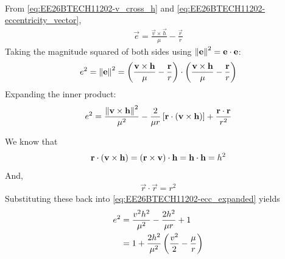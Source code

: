 \begin{enumerate}[label=\thesubsection.\arabic*, ref=\thesubsection.\theenumi]
\begin{align}
\end{align}
\solution
From \eqref{eq:EE26BTECH11202-v_cross_h} and \eqref{eq:EE26BTECH11202-eccentricity_vector},
\begin{align}
\vec{e} = \frac{\vec{v} \times \vec{h}}{\mu} - \frac{\vec{r}}{r}
\end{align}
Taking the magnitude squared of both sides using $\left\lVert\mathbf{e}\right\rVert^2 = \mathbf{e} \cdot \mathbf{e}$:
\begin{align}
e^2 = \left\lVert\mathbf{e}\right\rVert^2 = \left(\frac{\mathbf{v} \times \mathbf{h}}{\mu} - \frac{\mathbf{r}}{r}\right) \cdot \left(\frac{\mathbf{v} \times \mathbf{h}}{\mu} - \frac{\mathbf{r}}{r}\right)
\end{align}
Expanding the inner product:
\begin{align}
e^2 = \frac{\left\lVert\mathbf{v} \times \mathbf{h}\right\rVert^2}{\mu^2} - \frac{2}{\mu r} {}\left[\mathbf{r} \cdot \left(\mathbf{v} \times \mathbf{h}\right)\right] + \frac{\mathbf{r} \cdot \mathbf{r}}{r^2}
\label{eq:EE26BTECH11202-ecc_expanded}
\end{align}

We know that
\begin{align}
\mathbf{r} \cdot \left(\mathbf{v} \times \mathbf{h}\right) = \left(\mathbf{r} \times \mathbf{v}\right) \cdot \mathbf{h} = \mathbf{h} \cdot \mathbf{h} = h^2
\end{align}
And,
\begin{align}
\vec{r} \cdot \vec{r} = r^2
\end{align}
Substituting these back into \eqref{eq:EE26BTECH11202-ecc_expanded} yields
\begin{align}
e^2 &= \frac{v^2 h^2}{\mu^2} - \frac{2 h^2}{\mu r} + 1 
\\
&= 1 + \frac{2 h^2}{\mu^2} \left(\frac{v^2}{2} - \frac{\mu}{r}\right)
\label{eq:EE26BTECH11202-ecc_energy_sub}
\end{align}


\end{enumerate}
